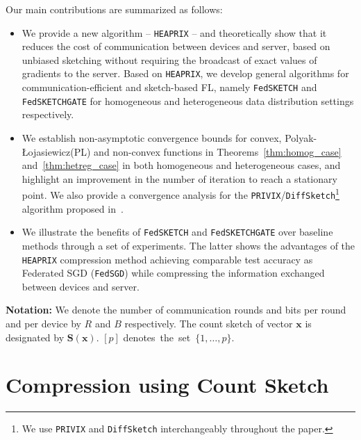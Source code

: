 \documentclass[11pt]{article}
\newcommand{\pl}{Polyak-\L{}ojasiewicz}
\begin{document}
 Our main contributions are summarized as follows:
\begin{itemize}
    \item We provide a new algorithm -- \texttt{HEAPRIX} -- and theoretically show that it reduces the cost of communication between devices and server, based on unbiased sketching without requiring the broadcast of exact values of gradients to the server. 
    Based on \texttt{HEAPRIX}, we develop general algorithms for communication-efficient and sketch-based FL, namely \texttt{FedSKETCH} and \texttt{FedSKETCHGATE} for  homogeneous and heterogeneous data distribution settings respectively.
    \item We establish non-asymptotic convergence bounds for convex, \pl\:(PL) and non-convex functions in Theorems~\ref{thm:homog_case} and~\ref{thm:hetreg_case} in both homogeneous and heterogeneous cases, and highlight an improvement in the number of iteration to reach a stationary point.
We also provide a convergence analysis for the \texttt{PRIVIX}/\texttt{DiffSketch}\footnote{We use \texttt{PRIVIX} and \texttt{DiffSketch} \cite{li2019privacy} interchangeably throughout the paper.} algorithm proposed in~\cite{li2019privacy}.
    \item We illustrate the benefits of \texttt{FedSKETCH} and \texttt{FedSKETCHGATE} over baseline methods through a set of experiments. 
    The latter shows the advantages of the \texttt{HEAPRIX} compression method achieving comparable test accuracy as Federated SGD (\texttt{FedSGD}) while compressing the information exchanged between devices and server.
\end{itemize}


\noindent\textbf{Notation:} 
We denote the number of communication rounds and bits per round and per device by $R$ and $B$ respectively. 
The count sketch of  vector $\boldsymbol{x}$ is designated by $\mathbf{S}(\boldsymbol{x})$. $[p]$ denotes~the~set~$\{1,\dots,p\}$.

\vspace{-0.05in}
\section{Compression using Count Sketch}\label{sec:compression}
\vspace{-0.05in}
\end{document}

